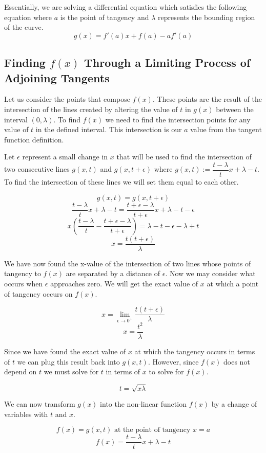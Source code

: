 \documentclass[12pt]{article}
\renewcommand\l[0]{\lambda}
\begin{document}
Essentially, we are solving a differential equation which satisfies the following equation where $a$ is the point of tangency and $\l$ represents the bounding region of the curve.
$$g(x) = f'(a)x + f(a) - a f'(a)$$

\subsection{Finding $f(x)$ Through a Limiting Process of Adjoining Tangents}
Let us consider the points that compose $f(x)$. These points are the result of the intersection of the lines created by altering the value of $t$ in $g(x)$ between the interval $(0, \l)$. To find $f(x)$ we need to find the intersection points for any value of $t$ in the defined interval. This intersection is our $a$ value from the tangent function definition.

\vspace{1 cm}

Let $\epsilon$ represent a small change in $x$ that will be used to find the intersection of two consecutive lines $g(x, t)$ and $g(x, t+\epsilon)$ where $g(x, t) := \dfrac{t-\l}{t}x + \l-t$. To find the intersection of these lines we will set them equal to each other.

$$g(x, t) = g(x, t+\epsilon)$$
$$\dfrac{t-\l}{t}x + \l-t = \dfrac{t+\epsilon-\l}{t+\epsilon}x + \l-t-\epsilon$$
$$x \left(\dfrac{t-\l}{t}-\dfrac{t+\epsilon-\l}{t+\epsilon}\right) = \l -t -\epsilon -\l + t$$
$$x=\dfrac{t(t+\epsilon)}{\l}$$

We have now found the x-value of the intersection of two lines whose points of tangency to $f(x)$ are separated by a distance of $\epsilon$. Now we may consider what occurs when $\epsilon$ approaches zero. We will get the exact value of $x$ at which a point of tangency occurs on $f(x)$.

$$x = \lim_{\epsilon \to 0^+} \dfrac{t(t+\epsilon)}{\l}$$
$$\boxed{x = \dfrac{t^2}{\l}}$$


Since we have found the exact value of $x$ at which the tangency occurs in terms of $t$ we can plug this result back into $g(x, t)$. However, since $f(x)$ does not depend on $t$ we must solve for $t$ in terms of $x$ to solve for $f(x)$.

$$t = \sqrt{x\l}$$

We can now transform $g(x)$ into the non-linear function $f(x)$ by a change of variables with $t$ and $x$.

$$f(x) = g \left(x, t \right) \text{ at the point of tangency } x=a$$
$$f(x)=\dfrac{t-\l}{t}x + \l - t$$
\end{document}
